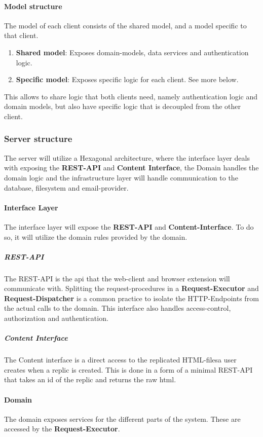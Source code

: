\paragraph{Model structure}
The model of each client consists of the shared model, and a model specific to that client.
\begin{enumerate}
    \item \textbf{Shared model}: Exposes domain-models, data services and authentication logic.
    \item \textbf{Specific model}: Exposes specific logic for each client.
    See more below.
\end{enumerate}
This allows to share logic that both clients need, namely authentication logic and domain models, but also have specific logic that is decoupled from the other client.

\subsubsection{Server structure}
The server will utilize a Hexagonal architecture, where the interface layer deals with exposing the \textbf{REST-API} and \textbf{Content Interface}, the Domain handles the domain logic and the infrastructure layer will handle communication to the database, filesystem and email-provider.

\paragraph{Interface Layer}
The interface layer will expose the \textbf{REST-API} and \textbf{Content-Interface}.
To do so, it will utilize the domain rules provided by the domain.

\subparagraph{REST-API}
The REST-API is the api that the web-client and browser extension will communicate with.
Splitting the request-procedures in a \textbf{Request-Executor} and \textbf{Request-Dispatcher} is a common practice to isolate the HTTP-Endpoints from the actual calls to the domain.
This interface also handles access-control, authorization and authentication.

\subparagraph{Content Interface}
The Content interface is a direct access to the replicated HTML-filesa user creates when a replic is created.
This is done in a form of a minimal REST-API that takes an id of the replic and returns the raw html.

\paragraph{Domain}
The domain exposes services for the different parts of the system.
These are accessed by the \textbf{Request-Executor}.

